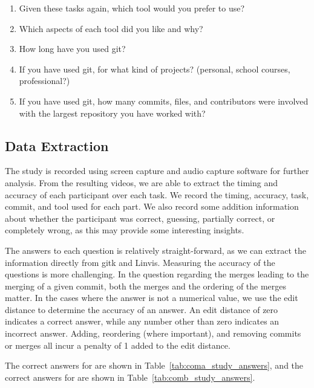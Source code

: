 \begin{enumerate}
  \item Given these tasks again, which tool would you prefer to use?
  \item Which aspects of each tool did you like and why?
  \item How long have you used git?
  \item If you have used git, for what kind of projects? (personal,
    school courses, professional?)
  \item If you have used git, how many commits, files, and contributors
    were involved with the largest repository you have worked with?
\end{enumerate}


\subsection{Data Extraction}
\label{sub:data_extraction}

The study is recorded using screen capture and audio capture software
for further analysis. From the resulting videos, we are able to extract
the timing and accuracy of each participant over each task. We record
the timing, accuracy, task, commit, and tool used for each part. We also
record some addition information about whether the participant was
correct, guessing, partially correct, or completely wrong, as this may
provide some interesting insights.

The answers to each question is relatively straight-forward, as we can
extract the information directly from gitk and Linvis. Measuring the
accuracy of the questions is more challenging. In the question regarding
the merges leading to the merging of a given commit, both the merges and
the ordering of the merges matter. In the cases where the answer is not
a numerical value, we use the edit distance to determine the accuracy of
an answer. An edit distance of zero indicates a correct answer, while
any number other than zero indicates an incorrect answer. Adding,
reordering (where important), and removing commits or merges all incur a
penalty of 1 added to the edit distance.

The correct answers for \comA are shown in
Table~\ref{tab:coma_study_answers}, and the correct answers for \comB are
shown in Table~\ref{tab:comb_study_answers}.


